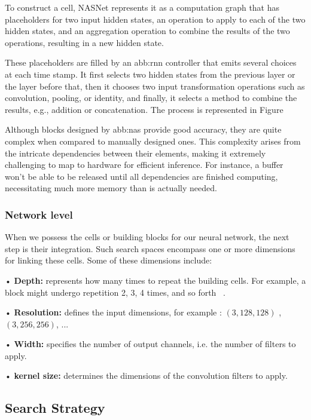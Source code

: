              To construct a cell, NASNet represents it as a computation graph that has placeholders for two input hidden states, an operation to apply to each of the two hidden states, and an aggregation operation to combine the results of the two operations, resulting in a new hidden state.
            
            These placeholders are filled by an \gls{abb:rnn} controller that emits several choices at each time stamp. It first selects two hidden states from the previous layer or the layer before that, then it chooses two input transformation operations such as convolution, pooling, or identity, and finally, it selects a method to combine the results, e.g., addition or concatenation. The process is represented in Figure

            Although blocks designed by \gls{abb:nas} provide good accuracy, they are quite complex when compared to manually designed ones. This complexity arises from the intricate dependencies between their elements, making it extremely challenging to map to hardware for efficient inference. For instance, a buffer won't be able to be released until all dependencies are finished computing, necessitating much more memory than is actually needed.


        \subsubsection{Network level}

        When we possess the cells or building blocks for our neural network, the next step is their integration. Such search spaces encompass one or more dimensions for linking these cells. Some of these dimensions include:
        
            • \textbf{Depth:} represents how many times to repeat the building cells. For example, a block might undergo repetition 2, 3, 4 times, and so forth ~\cite{onceforall}.
            
            • \textbf{Resolution:} defines the input dimensions, for example : $(3,128,128)$ , $(3,256,256)$, ... ~\cite{onceforall}
            
            • \textbf{Width:} specifies the number of output channels, i.e. the number of filters to apply.~\cite{onceforall}
            
            • \textbf{kernel size:} determines the dimensions of the convolution filters to apply.~\cite{proxylessnas}

    \subsection{Search Strategy}

